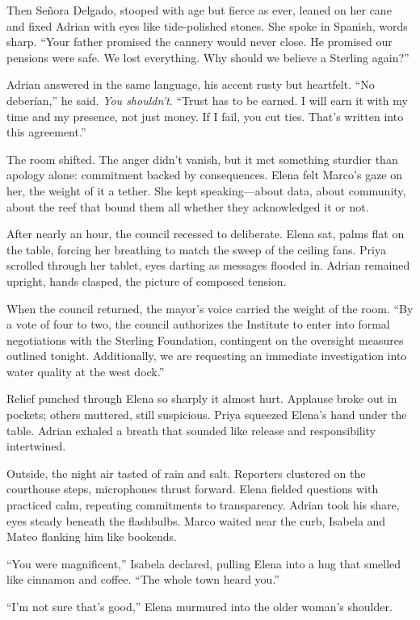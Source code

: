 Then Señora Delgado, stooped with age but fierce as ever, leaned on her cane and fixed Adrian with eyes like tide-polished stones. She spoke in Spanish, words sharp. “Your father promised the cannery would never close. He promised our pensions were safe. We lost everything. Why should we believe a Sterling again?”

Adrian answered in the same language, his accent rusty but heartfelt. “No deberían,” he said. \textit{You shouldn’t}. “Trust has to be earned. I will earn it with my time and my presence, not just money. If I fail, you cut ties. That’s written into this agreement.”

The room shifted. The anger didn’t vanish, but it met something sturdier than apology alone: commitment backed by consequences. Elena felt Marco’s gaze on her, the weight of it a tether. She kept speaking—about data, about community, about the reef that bound them all whether they acknowledged it or not.

After nearly an hour, the council recessed to deliberate. Elena sat, palms flat on the table, forcing her breathing to match the sweep of the ceiling fans. Priya scrolled through her tablet, eyes darting as messages flooded in. Adrian remained upright, hands clasped, the picture of composed tension.

When the council returned, the mayor’s voice carried the weight of the room. “By a vote of four to two, the council authorizes the Institute to enter into formal negotiations with the Sterling Foundation, contingent on the oversight measures outlined tonight. Additionally, we are requesting an immediate investigation into water quality at the west dock.”

Relief punched through Elena so sharply it almost hurt. Applause broke out in pockets; others muttered, still suspicious. Priya squeezed Elena’s hand under the table. Adrian exhaled a breath that sounded like release and responsibility intertwined.

Outside, the night air tasted of rain and salt. Reporters clustered on the courthouse steps, microphones thrust forward. Elena fielded questions with practiced calm, repeating commitments to transparency. Adrian took his share, eyes steady beneath the flashbulbs. Marco waited near the curb, Isabela and Mateo flanking him like bookends.

“You were magnificent,” Isabela declared, pulling Elena into a hug that smelled like cinnamon and coffee. “The whole town heard you.”

“I’m not sure that’s good,” Elena murmured into the older woman’s shoulder.

